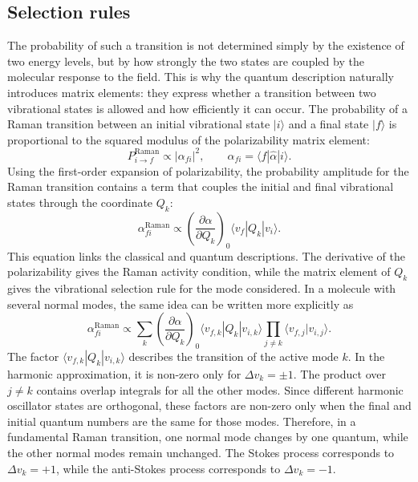 \subsection{Selection rules}
\label{subsec:selection_rules}

The probability of such a transition is not determined simply by the existence of two energy levels, but by how strongly the two states are coupled by the molecular response to the field. This is why the quantum description naturally introduces matrix elements: they express whether a transition between two vibrational states is allowed and how efficiently it can occur. The probability of a Raman transition between an initial vibrational state \(|i\rangle\) and a final state \(|f\rangle\) is proportional to the squared modulus of the polarizability matrix element:
\begin{equation}
    P_{i\rightarrow f}^{\mathrm{Raman}} \propto
    \left|\alpha_{fi}\right|^2,
    \qquad
    \alpha_{fi} = \langle f|\hat{\alpha}|i\rangle .
    \label{eq:raman_transition_probability}
\end{equation}
Using the first-order expansion of polarizability, the probability amplitude for the Raman transition contains a term that couples the initial and final vibrational states through the coordinate \(Q_k\):
\begin{equation}
    \alpha_{fi}^{\mathrm{Raman}} \propto
    \left(\frac{\partial \alpha}{\partial Q_k}\right)_0
    \langle v_f|Q_k|v_i\rangle .
    \label{eq:raman_matrix_element}
\end{equation}
This equation links the classical and quantum descriptions. The derivative of the polarizability gives the Raman activity condition, while the matrix element of \(Q_k\) gives the vibrational selection rule for the mode considered. In a molecule with several normal modes, the same idea can be written more explicitly as
\begin{equation}
    \alpha_{fi}^{\mathrm{Raman}} \propto
    \sum_k
    \left(\frac{\partial \alpha}{\partial Q_k}\right)_0
    \langle v_{f,k}|Q_k|v_{i,k}\rangle
    \prod_{j\neq k}
    \langle v_{f,j}|v_{i,j}\rangle .
    \label{eq:raman_matrix_element_multimode}
\end{equation}
The factor \(\langle v_{f,k}|Q_k|v_{i,k}\rangle\) describes the transition of the active mode \(k\). In the harmonic approximation, it is non-zero only for \(\Delta v_k=\pm 1\). The product over \(j\neq k\) contains overlap integrals for all the other modes. Since different harmonic oscillator states are orthogonal, these factors are non-zero only when the final and initial quantum numbers are the same for those modes. Therefore, in a fundamental Raman transition, one normal mode changes by one quantum, while the other normal modes remain unchanged. The Stokes process corresponds to \(\Delta v_k=+1\), while the anti-Stokes process corresponds to \(\Delta v_k=-1\).

